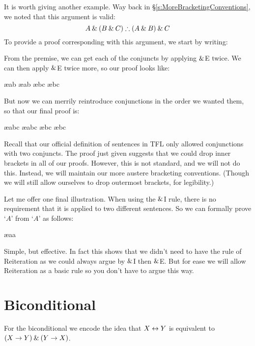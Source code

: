 It is worth giving another example. Way back in \S\ref{s:MoreBracketingConventions}, we noted that this argument is valid:
	$$A \eand (B \eand C) \therefore (A \eand B) \eand C$$
To provide a proof corresponding with this argument, we start by writing:
\begin{pf}
\end{pf}
From the premise, we can get each of the conjuncts by applying $\mathbin{\&}$E twice. We can then apply $\mathbin{\&}$E twice more, so our proof looks like:
\begin{pf}
	 \ae{ab}
	 \ae{ab}
	 \ae{bc}
	 \ae{bc}
\end{pf}
But now we can merrily reintroduce conjunctions in the order we wanted them, so that our final proof is:
\begin{pf}
	 \ae{abc}
	 \ae{abc}
	 \ae{bc}
	 \ae{bc}
\end{pf}
Recall that our official definition of sentences in TFL only allowed conjunctions with two conjuncts. The proof just given suggests that we could drop inner brackets in all of our proofs. However, this is not standard, and we will not do this. Instead, we will maintain our more austere bracketing conventions. (Though we will still allow ourselves to drop outermost brackets, for legibility.)

Let me offer one final illustration. When using the $\mathbin{\&}$I rule, there is no requirement that it is applied to two different sentences. So we can formally prove `$A$' from `$A$' as follows:
\begin{pf}
	\ae{aa}
\end{pf}
Simple, but effective. In fact this shows that we didn't need to have the rule of Reiteration as we could always argue by $\mathbin{\&}$I then $\mathbin{\&}$E. But for ease we will allow Reiteration as a basic rule so you don't have to argue this way. 



\section{Biconditional}

For the biconditional we encode the idea that $X\leftrightarrow Y$ is equivalent to $(X\rightarrow Y)\mathbin{\&}(Y\rightarrow X)$. 

